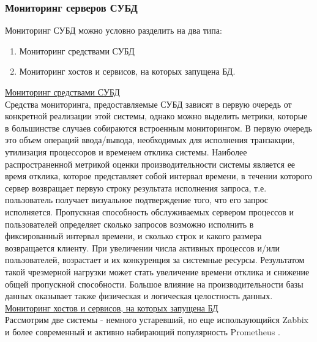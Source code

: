 
\subsubsection{Мониторинг серверов СУБД}
Мониторинг СУБД можно условно разделить на два типа:
\begin{enumerate}
    \item Мониторинг средствами СУБД
    \item Мониторинг хостов и сервисов, на которых запущена БД.
\end{enumerate}
\underline{Мониторинг средствами СУБД} \\ Средства мониторинга, предоставляемые СУБД зависят в первую очередь от конкретной реализации этой системы, однако можно выделить метрики, которые в большинстве случаев собираются встроенным мониторингом. В первую очередь это объем операций ввода/вывода, необходимых для исполнения транзакции, утилизация процессоров и временем отклика системы. Наиболее распространенной метрикой оценки производительности системы является ее время отклика, которое представляет собой интервал времени, в течении которого сервер возвращает первую строку результата исполнения запроса, т.е. пользователь получает визуальное подтверждение того, что его запрос исполняется. Пропускная способность обслуживаемых сервером процессов и пользователей определяет сколько запросов возможно исполнить в фиксированный интервал времени, и сколько строк и какого размера возвращается клиенту. При увеличении числа активных процессов и/или пользователей, возрастает и их конкуренция за системные ресурсы. Результатом такой чрезмерной нагрузки может стать увеличение времени отклика и снижение общей пропускной способности. Большое влияние на производительности базы данных оказывает также физическая и логическая целостность данных. \\
\underline{Мониторинг хостов и сервисов, на которых запущена БД} \\ Рассмотрим две системы - немного устаревший, но еще использующийся Zabbix и более современный и активно набирающий популярность Prometheus \autocite{Prometheus-vs-Zabbix}.
